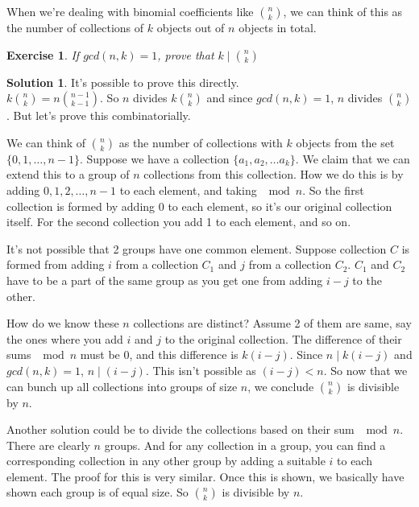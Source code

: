 \documentclass[a4paper,10pt]{article}
\newtheorem{exercise}{Exercise}[section]
\theoremstyle{definition} %
\newtheorem*{solution}{Solution}
\begin{document}
    When we're dealing with binomial coefficients like $\binom{n}{k}$, we can think of
    this as the number of collections of $k$ objects out of $n$ objects in total.

    \begin{exercise}
        If $gcd(n,k) = 1$, prove that $k \mid \binom{n}{k}$
    \end{exercise}
    \begin{solution}
        It's possible to prove this directly. \\
        $k \binom{n}{k} = n \binom{n-1}{k-1}$. So $n$ divides $k \binom{n}{k}$ and
        since $gcd(n,k)=1$, $n$ divides $\binom{n}{k}$. But let's prove this combinatorially.

        We can think of $\binom{n}{k}$ as the number of collections with $k$ objects
        from the set $\{0, 1, \dots, n-1\}$. Suppose we have a collection $\{a_1,
        a_2, \dots a_k \}$. We claim that we can extend this to a group of $n$ collections from this 
        collection. How we do this is by adding $0, 1, 2, \dots, n-1$ to each element, 
        and taking $\mod n$. So the first collection is formed by adding $0$ to each element,
        so it's our original collection itself. For the second collection you add 1 to 
        each element, and so on.

        It's not possible that 2 groups have one common element. Suppose collection $C$ is formed
        from adding $i$ from a collection $C_1$ and $j$ from a collection $C_2$. $C_1$ and $C_2$
        have to be a part of the same group as you get one from adding $i-j$ to the other.

        How do we know these $n$ collections are distinct? Assume 2 of them are same, say the ones where
        you add $i$ and $j$ to the original collection. The difference of their sums $\mod n$ must 
        be 0, and this difference is $k(i-j)$. Since $n \mid k(i-j)$ and $gcd(n,k)=1$, $n \mid (i-j)$.
        This isn't possible as $(i-j) < n$. So now that we can bunch up all collections into groups
        of size $n$, we conclude $\binom{n}{k}$ is divisible by $n$.

        Another solution could be to divide the collections based on their sum $\mod n$. There are
        clearly $n$ groups. And for any collection in a group, you can find a corresponding collection
        in any other group by adding a suitable $i$ to each element. The proof for this is very similar. Once this is 
        shown, we basically have shown each group is of equal size. So $\binom{n}{k}$ is divisible by $n$.
    \end{solution}
\end{document}
